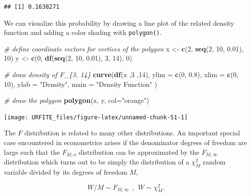 \documentclass[]{book}
\newenvironment{Shaded}{\begin{snugshade}}{\end{snugshade}}
\newcommand{\KeywordTok}[1]{\textcolor[rgb]{0.13,0.29,0.53}{\textbf{#1}}}
\newcommand{\DataTypeTok}[1]{\textcolor[rgb]{0.13,0.29,0.53}{#1}}
\newcommand{\DecValTok}[1]{\textcolor[rgb]{0.00,0.00,0.81}{#1}}
\newcommand{\FloatTok}[1]{\textcolor[rgb]{0.00,0.00,0.81}{#1}}
\newcommand{\StringTok}[1]{\textcolor[rgb]{0.31,0.60,0.02}{#1}}
\newcommand{\CommentTok}[1]{\textcolor[rgb]{0.56,0.35,0.01}{\textit{#1}}}
\newcommand{\NormalTok}[1]{#1}
\theoremstyle{definition}
\theoremstyle{definition}
\theoremstyle{definition}
\theoremstyle{remark}
\begin{document}
\begin{verbatim}
## [1] 0.1638271
\end{verbatim}

We can visualize this probability by drawing a line plot of the related
density function and adding a color shading with \texttt{polygon()}.

\begin{Shaded}
\begin{Highlighting}[]
\CommentTok{# define coordinate vectors for vertices of the polygon}
\NormalTok{x <-}\StringTok{ }\KeywordTok{c}\NormalTok{(}\DecValTok{2}\NormalTok{, }\KeywordTok{seq}\NormalTok{(}\DecValTok{2}\NormalTok{, }\DecValTok{10}\NormalTok{, }\FloatTok{0.01}\NormalTok{), }\DecValTok{10}\NormalTok{)}
\NormalTok{y <-}\StringTok{ }\KeywordTok{c}\NormalTok{(}\DecValTok{0}\NormalTok{, }\KeywordTok{df}\NormalTok{(}\KeywordTok{seq}\NormalTok{(}\DecValTok{2}\NormalTok{, }\DecValTok{10}\NormalTok{, }\FloatTok{0.01}\NormalTok{), }\DecValTok{3}\NormalTok{, }\DecValTok{14}\NormalTok{), }\DecValTok{0}\NormalTok{)}

\CommentTok{# draw density of F_\{3, 14\}}
\KeywordTok{curve}\NormalTok{(}\KeywordTok{df}\NormalTok{(x ,}\DecValTok{3}\NormalTok{ ,}\DecValTok{14}\NormalTok{), }
      \DataTypeTok{ylim =} \KeywordTok{c}\NormalTok{(}\DecValTok{0}\NormalTok{, }\FloatTok{0.8}\NormalTok{), }
      \DataTypeTok{xlim =} \KeywordTok{c}\NormalTok{(}\DecValTok{0}\NormalTok{, }\DecValTok{10}\NormalTok{), }
      \DataTypeTok{ylab =} \StringTok{"Density"}\NormalTok{,}
      \DataTypeTok{main =} \StringTok{"Density Function"}
\NormalTok{      )}

\CommentTok{# draw the polygon}
\KeywordTok{polygon}\NormalTok{(x, y, }\DataTypeTok{col=}\StringTok{"orange"}\NormalTok{)}
\end{Highlighting}
\end{Shaded}

\begin{center}\texttt{[image: URFITE\_files/figure-latex/unnamed-chunk-51-1]} \end{center}

The \(F\) distribution is related to many other distributions. An
important special case encountered in econometrics arises if the
denominator degrees of freedom are large such that the \(F_{M,n}\)
distribution can be approximated by the \(F_{M,\infty}\) distribution
which turns out to be simply the distribution of a \(\chi^2_M\) random
variable divided by its degrees of freedom \(M\),

\[ W/M \sim F_{M,\infty} \ \ , \ \ W \sim \chi^2_M. \]
\end{document}
